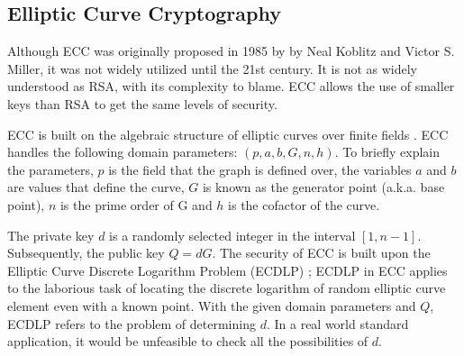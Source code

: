 \subsection{Elliptic Curve Cryptography}

Although ECC was originally proposed in 1985 by by Neal Koblitz and Victor S. Miller, it was not widely utilized until the 21st century. It is not as widely understood as RSA, with its complexity to blame. ECC allows the use of smaller keys than RSA to get the same levels of security. 

ECC is built on the algebraic structure of elliptic curves over finite fields \cite{RSA_ECC}. ECC handles the following domain parameters: \((p,a,b,G,n,h)\). To briefly explain the parameters, \(p\) is the field that the graph is defined over, the variables \(a\) and \(b\) are values that define the curve, \(G\) is known as the generator point (a.k.a. base point), \(n\) is the prime order of G and \(h\) is the cofactor of the curve.

The private key \(d\) is a randomly selected integer in the interval \( [ 1 , n - 1 ]\). Subsequently, the public key \(Q=dG\). The security of ECC is built upon the Elliptic Curve Discrete Logarithm Problem (ECDLP) \cite{RSA_ECC}; ECDLP in ECC applies to the laborious task of locating the discrete logarithm of random elliptic curve element even with a known point. With the given domain parameters and \(Q\), ECDLP refers to the problem of determining \(d\). In a real world standard application, it would be unfeasible to check all the possibilities of \(d\).